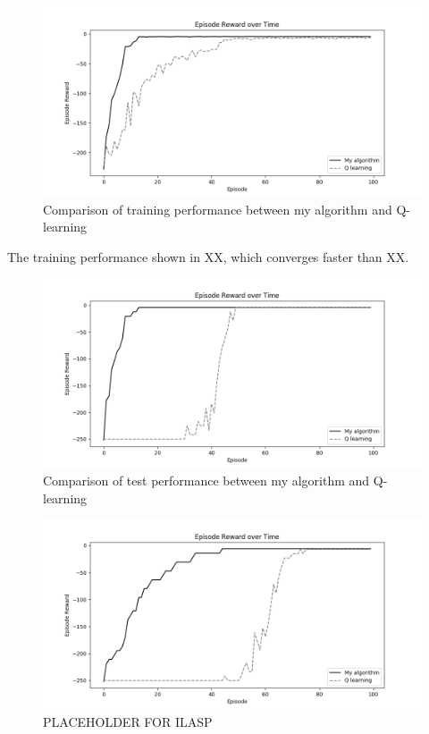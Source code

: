 \begin{figure}[!htb]
\centering
\includegraphics[width=1.0\textwidth]{./figures/experiment3_training}
\caption{Comparison of training performance between my algorithm and Q-learning}
\label{experiment3_training}
\end{figure}

The training performance shown in XX, which converges faster than XX. 

\begin{figure}[!htb]
\centering
\includegraphics[width=1.0\textwidth]{./figures/experiment3_test}
\caption{Comparison of test performance between my algorithm and Q-learning}
\label{experiment3_test}
\end{figure}

\begin{figure}[!htb]
\centering
\includegraphics[width=1.0\textwidth]{./figures/experiment1_test}
\caption{PLACEHOLDER FOR ILASP}
\label{experiment1_test}
\end{figure}


